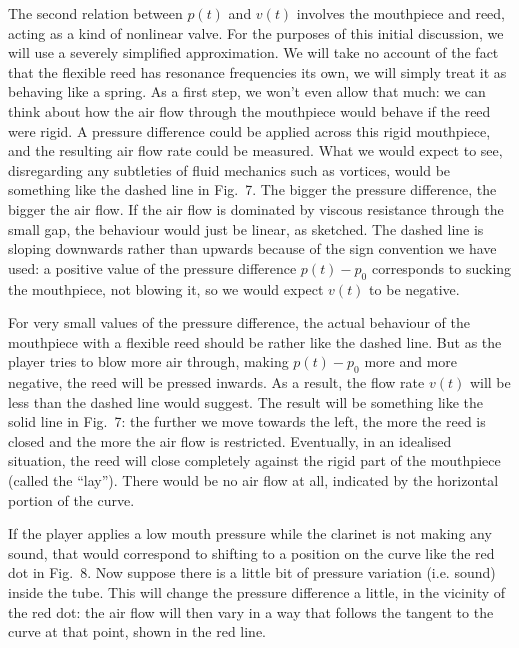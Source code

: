  The second relation between $p(t)$ and $v(t)$ involves the mouthpiece and 
  reed, acting as a kind of nonlinear valve. For the purposes of this initial 
  discussion, we will use a severely simplified approximation. We will take no 
  account of the fact that the flexible reed has resonance frequencies its own, 
  we will simply treat it as behaving like a spring. As a first step, we won’t 
  even allow that much: we can think about how the air flow through the 
  mouthpiece would behave if the reed were rigid. A pressure difference could 
  be applied across this rigid mouthpiece, and the resulting air flow rate 
  could be measured. What we would expect to see, disregarding any subtleties 
  of fluid mechanics such as vortices, would be something like the dashed line 
  in Fig.\ 7. The bigger the pressure difference, the bigger the air flow. If 
  the air flow is dominated by viscous resistance through the small gap, the 
  behaviour would just be linear, as sketched. The dashed line is sloping 
  downwards rather than upwards because of the sign convention we have used: a 
  positive value of the pressure difference $p(t)-p_0$ corresponds to sucking 
  the mouthpiece, not blowing it, so we would expect $v(t)$ to be negative. 

  For very small values of the pressure difference, the actual behaviour of the 
  mouthpiece with a flexible reed should be rather like the dashed line. But as 
  the player tries to blow more air through, making $p(t)-p_0$ more and more 
  negative, the reed will be pressed inwards. As a result, the flow rate $v(t)$ 
  will be less than the dashed line would suggest. The result will be something 
  like the solid line in Fig.\ 7: the further we move towards the left, the 
  more the reed is closed and the more the air flow is restricted. Eventually, 
  in an idealised situation, the reed will close completely against the rigid 
  part of the mouthpiece (called the “lay”). There would be no air flow at all, 
  indicated by the horizontal portion of the curve. 

  If the player applies a low mouth pressure while the clarinet is not making 
  any sound, that would correspond to shifting to a position on the curve like 
  the red dot in Fig.\ 8. Now suppose there is a little bit of pressure 
  variation (i.e. sound) inside the tube. This will change the pressure 
  difference a little, in the vicinity of the red dot: the air flow will then 
  vary in a way that follows the tangent to the curve at that point, shown in 
  the red line. 

